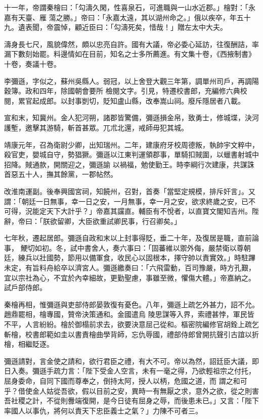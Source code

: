 \begin{pinyinscope}
 十一年，帝謂秦檜曰：「勾濤久閑，性喜泉石，可進職與一山水近郡。」檜對：「永嘉有天臺、雁
 蕩之勝。」帝曰：「永嘉太遠，其以湖州命之。」俄以疾卒，年五十九。遺表聞，帝震悼，顧近臣曰：「勾濤死矣，惜哉！」贈左太中大夫。



 濤身長七尺，風貌偉然，頗以忠亮自許。國有大議，帝必委心延訪，往復酬詰，率漏下數刻始罷。料邊情如在目前，知名之士多所薦進。有文集十卷，《西掖制書》十卷，奏議十卷。



 李彌遜，字似之，蘇州吳縣人。弱冠，以上舍登大觀三年第，調單州司戶，再調陽穀簿。政和四年，除國朝會要所
 檢閱文字。引見，特遷校書郎，充編修六典校閱，累官起成郎。以封事剴切，貶知盧山縣，改奉嵩山祠。廢斥隱居者八載。



 宣和末，知冀州。金人犯河朔，諸郡皆驚備，彌遜損金帛，致勇士，修城堞，決河護塹，邀擊其游騎，斬首甚眾。兀朮北還，戒師毋犯其城。



 靖康元年，召為衛尉少卿，出知瑞州。二年，建康府牙校周德叛，執帥宇文粹中，殺官吏，嬰城自守，勢猖獗。彌遜以江東判運領郡事，單騎扣賊圍，以蠟書射城中招降。賊通款，開關迎之，彌遜諭
 以禍福，勉使勤王。時李綱行次建康，共謀誅首惡五十人，撫其餘黨，一郡帖然。



 改淮南運副。後奉興國宮祠，知饒州，召對，首奏「當堅定規模，排斥奸言」。又謂：「朝廷一日無事，幸一日之安，一月無事，幸一月之安，欲求終歲之安，已不可得，況能定天下大計乎？」帝嘉其讜直。輔臣有不悅者，以直寶文閣知吉州。陛辭，帝曰：「朕欲留卿，大臣欲重試卿民事，行召卿矣。」



 七年秋，遷起居郎。彌遜自政和末以上封事得貶，垂二十年，及復居是職，直前論事，
 鯁切如初。冬，試中書舍人，奏六事曰：「固蕃維以禦外侮，嚴禁衛以尊朝廷，練兵以壯國勢，節用以備軍食，收民心以固根本，擇守帥以責實效。」時駐蹕未定，有旨料舟給卒以濟宮人。彌遜繳奏曰：「六飛雷動，百司豫嚴，時方孔艱，宜以宗社為心，不宜於內幸細故，更勤聖慮，事雖至微，懼傷大體。」帝嘉納之。試戶部侍郎。



 秦檜再相，惟彌遜與吏部侍郎晏敦復有憂色。八年，彌遜上疏乞外甚力，詔不允。趙鼎罷相，檜專國，贊帝決策通和。金國遣烏
 陵思謀等入界，索禮甚悖，軍民皆不平，人言紛紛。檜於御榻前求去，欲要決意屈己從和。樞密院編修官胡銓上疏乞斬檜，校書郎範如圭以書責檜曲學背師，忘仇辱國，禮部侍郎曾開抗聲引古誼以折檜，相繼貶逐。



 彌遜請對，言金使之請和，欲行君臣之禮，有大不可。帝以為然，詔廷臣大議，即日入奏。彌遜手疏力言：「陛下受金人空言，未有一毫之得，乃欲輕祖宗之付托，屈身委命，自同下國而尊奉之，倒持太阿，授人以柄，危國之道，而
 謂之和可乎？借使金人姑從吾欲，假以目前之安，異時一有無厭之求，意外之欲，從之則害吾社稷之計，不從則釁端復開，是今日徒有屈身之辱，而後患未已。」又言：「陛下率國人以事仇，將何以責天下忠臣義士之氣？」力陳不可者三。




\end{pinyinscope}
